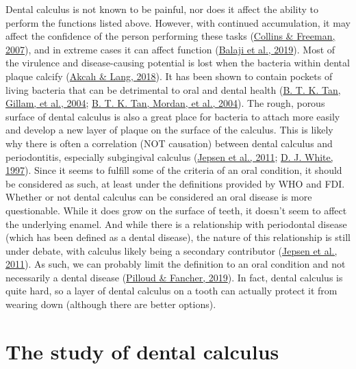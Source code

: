 \documentclass[
  letterpaper,
]{book}
\begin{document}
Dental calculus is not known to be painful, nor does it affect the
ability to perform the functions listed above. However, with continued
accumulation, it may affect the confidence of the person performing
these tasks (\protect\hyperlink{ref-collinsHomelessDental2007}{Collins
\& Freeman, 2007}), and in extreme cases it can affect function
(\protect\hyperlink{ref-balajiUnusualPresentation2019}{Balaji et al.,
2019}). Most of the virulence and disease-causing potential is lost when
the bacteria within dental plaque calcify
(\protect\hyperlink{ref-akcaliDentalCalculus2018}{Akcalı \& Lang,
2018}). It has been shown to contain pockets of living bacteria that can
be detrimental to oral and dental health
(\protect\hyperlink{ref-tanCalculusUltrastructure2004}{B. T. K. Tan,
Gillam, et al., 2004};
\protect\hyperlink{ref-tanBacterialViability2004}{B. T. K. Tan, Mordan,
et al., 2004}). The rough, porous surface of dental calculus is also a
great place for bacteria to attach more easily and develop a new layer
of plaque on the surface of the calculus. This is likely why there is
often a correlation (NOT causation) between dental calculus and
periodontitis, especially subgingival calculus
(\protect\hyperlink{ref-jepsenCalculusRemoval2011}{Jepsen et al., 2011};
\protect\hyperlink{ref-whiteDentalCalculus1997}{D. J. White, 1997}).
Since it seems to fulfill some of the criteria of an oral condition, it
should be considered as such, at least under the definitions provided by
WHO and FDI. Whether or not dental calculus can be considered an oral
disease is more questionable. While it does grow on the surface of
teeth, it doesn't seem to affect the underlying enamel. And while there
is a relationship with periodontal disease (which has been defined as a
dental disease), the nature of this relationship is still under debate,
with calculus likely being a secondary contributor
(\protect\hyperlink{ref-jepsenCalculusRemoval2011}{Jepsen et al.,
2011}). As such, we can probably limit the definition to an oral
condition and not necessarily a dental disease
(\protect\hyperlink{ref-pilloudOutliningDefinition2019}{Pilloud \&
Fancher, 2019}). In fact, dental calculus is quite hard, so a layer of
dental calculus on a tooth can actually protect it from wearing down
(although there are better options).

\hypertarget{intro-study}{%
\section{The study of dental calculus}\label{intro-study}}
\end{document}
